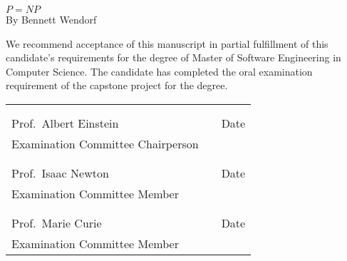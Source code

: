 \thispagestyle{empty}
\vspace*{0.3in}
\begin{center}
	\large{\textbf{\(P = NP\)}} \\ %
	\vspace{0.75in}
	\normalsize{By Bennett Wendorf}
\end{center}

\vspace{0.5in}
\noindent We recommend acceptance of this manuscript in partial fulfillment of this candidate's requirements for the degree of Master of Software Engineering in Computer Science. The candidate has completed the oral examination requirement of the capstone project for the degree. \\

\noindent
\begin{tabularx}{\textwidth}{p{3in}Xp{2in}} %
	\rule{0pt}{50pt} & & \\
	\hrulefill & & \hrulefill \\
	Prof.\ Albert Einstein & & Date \\
	Examination Committee Chairperson & & \\
	\rule{0pt}{50pt} & & \\
	\hrulefill & & \hrulefill \\
	Prof.\ Isaac Newton & & Date \\
	Examination Committee Member & & \\
	\rule{0pt}{50pt} & & \\
	\hrulefill & & \hrulefill \\
	Prof.\ Marie Curie & & Date \\
	Examination Committee Member & & \\
\end{tabularx}

